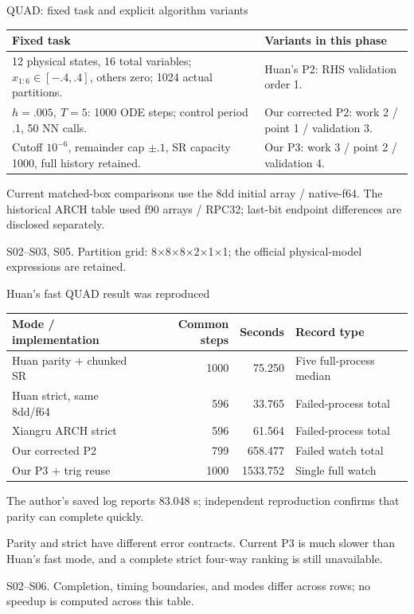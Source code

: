 \documentclass[aspectratio=169,11pt]{beamer}
\newcommand{\src}[1]{\par\vfill{\fontsize{7}{9}\selectfont\color{gray}#1\par}}
\begin{document}
\begin{frame}[t]{QUAD: fixed task and explicit algorithm variants}
\relax
\relax
{\small\renewcommand{\arraystretch}{1.18}\noindent\begin{tabularx}{\linewidth}{@{}X X@{}}\toprule
\textbf{Fixed task} & \textbf{Variants in this phase}\\\midrule
12 physical states, 16 total variables; \(x_{1:6}\in[-.4,.4]\), others zero; 1024 actual partitions. & Huan's P2: RHS validation order 1.\\
\(h=.005,\ T=5\): 1000 ODE steps; control period .1, 50 NN calls. & Our corrected P2: work 2 / point 1 / validation 3.\\
Cutoff \(10^{-6}\), remainder cap \(\pm.1\), SR capacity 1000, full history retained. & Our P3: work 3 / point 2 / validation 4.\\
\bottomrule\end{tabularx}\par{}}\vspace{0.3cm}Current matched-box comparisons use the 8dd initial array / native-f64. The historical ARCH table used f90 arrays / RPC32; last-bit endpoint differences are disclosed separately.
\src{S02–S03, S05. Partition grid: 8×8×8×2×1×1; the official physical-model expressions are retained.}
\end{frame}

\begin{frame}[t]{Huan's fast QUAD result was reproduced}
\relax
\relax
{\footnotesize\setlength{\tabcolsep}{3.2pt}\renewcommand{\arraystretch}{1.18}
\noindent\begin{tabular*}{\linewidth}{@{\extracolsep{\fill}}lrrl@{}}\toprule
\textbf{Mode / implementation} & \textbf{Common steps} & \textbf{Seconds} & \textbf{Record type}\\ \midrule
Huan parity + chunked SR & 1000 & 75.250 & Five full-process median\\
Huan strict, same 8dd/f64 & 596 & 33.765 & Failed-process total\\
Xiangru ARCH strict & 596 & 61.564 & Failed-process total\\
Our corrected P2 & 799 & 658.477 & Failed watch total\\
Our P3 + trig reuse & 1000 & 1533.752 & Single full watch\\
\bottomrule\end{tabular*}\par{}}\vspace{0.3cm}The author's saved log reports 83.048 s; independent reproduction confirms that parity can complete quickly.\par{}Parity and strict have different error contracts. Current P3 is much slower than Huan's fast mode, and a complete strict four-way ranking is still unavailable.
\src{S02–S06. Completion, timing boundaries, and modes differ across rows; no speedup is computed across this table.}
\end{frame}
\end{document}
